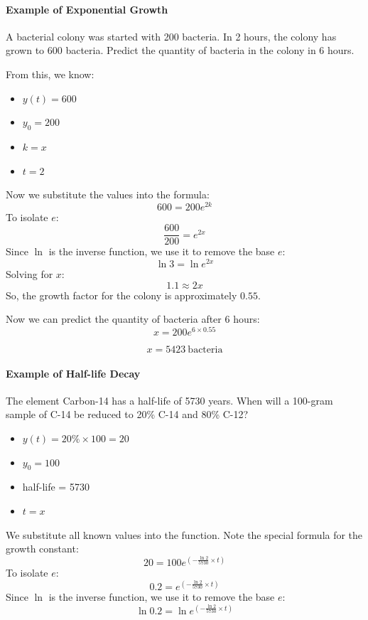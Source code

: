 \paragraph{Example of Exponential Growth}



A bacterial colony was started with 200 bacteria. In 2 hours, the colony has grown to 600 bacteria. Predict the quantity of bacteria in the colony in 6 hours.



From this, we know:



\begin{itemize}
    \item $y(t) = 600$
    \item $y_0 = 200$
    \item $k = x$
    \item $t = 2$
\end{itemize}

Now we substitute the values into the formula:
$$
600 = 200 e^{2k}
$$
To isolate $e$:
$$
\frac{600}{200} = e^{2x}
$$
Since $\ln$ is the inverse function, we use it to remove the base $e$:
$$
\ln 3 = \ln e^{2x}
$$
Solving for $x$:
$$
1.1 \approx 2x
$$
So, the growth factor for the colony is approximately $0.55$.



Now we can predict the quantity of bacteria after 6 hours:
$$
x = 200 e^{6 \times 0.55}
$$



$$
x = 5423\ \text{bacteria}
$$
\paragraph{Example of Half-life Decay}



The element Carbon-14 has a half-life of 5730 years. When will a 100-gram sample of C-14 be reduced to 20\% C-14 and 80\% C-12?



\begin{itemize}
    \item $y(t) = 20\% \times 100 = 20$
    \item $y_0 = 100$
    \item half-life = 5730
    \item $t = x$
\end{itemize}

We substitute all known values into the function. Note the special formula for the growth constant:
$$
20 = 100 e^{\left(-\frac{\ln 2}{5730} \times t\right)}
$$
To isolate $e$:
$$
0.2 = e^{\left(-\frac{\ln 2}{5730} \times t\right)}
$$
Since $\ln$ is the inverse function, we use it to remove the base $e$:
$$
\ln 0.2 = \ln e^{\left(-\frac{\ln 2}{5730} \times t\right)}
$$



